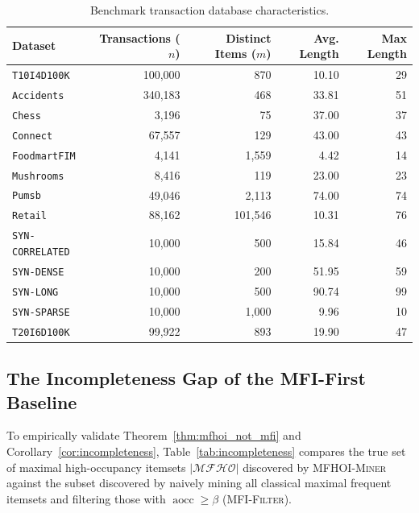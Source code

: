 \documentclass[runningheads,orivec]{llncs}
\newcommand{\aocc}{\operatorname{aocc}}
\newcommand{\MFHOI}{\ensuremath{\mathcal{MFHO}}}
\newcommand{\MFHOIMiner}{\textsc{MFHOI-Miner}}
\begin{document}
\begin{table}[htbp]
\centering
\caption{Benchmark transaction database characteristics.}
\label{tab:datasets}
\begin{tabular}{lrrrr}
\toprule
\textbf{Dataset} & \textbf{Transactions ($n$)} & \textbf{Distinct Items ($m$)} & \textbf{Avg. Length} & \textbf{Max Length} \\
\midrule
\texttt{T10I4D100K}    & 100,000 & 870     & 10.10 & 29 \\
\texttt{Accidents}     & 340,183 & 468     & 33.81 & 51 \\
\texttt{Chess}         & 3,196   & 75      & 37.00 & 37 \\
\texttt{Connect}       & 67,557  & 129     & 43.00 & 43 \\
\texttt{FoodmartFIM}   & 4,141   & 1,559   & 4.42  & 14 \\
\texttt{Mushrooms}     & 8,416   & 119     & 23.00 & 23 \\
\texttt{Pumsb}         & 49,046  & 2,113   & 74.00 & 74 \\
\texttt{Retail}        & 88,162  & 101,546 & 10.31 & 76 \\
\texttt{SYN-CORRELATED}& 10,000  & 500     & 15.84 & 46 \\
\texttt{SYN-DENSE}     & 10,000  & 200     & 51.95 & 59 \\
\texttt{SYN-LONG}      & 10,000  & 500     & 90.74 & 99 \\
\texttt{SYN-SPARSE}    & 10,000  & 1,000   & 9.96  & 10 \\
\texttt{T20I6D100K}    & 99,922  & 893     & 19.90 & 47 \\
\bottomrule
\end{tabular}
\end{table}

\subsection{The Incompleteness Gap of the MFI-First Baseline}

To empirically validate Theorem~\ref{thm:mfhoi_not_mfi} and Corollary~\ref{cor:incompleteness}, Table~\ref{tab:incompleteness} compares the true set of maximal high-occupancy itemsets $|\MFHOI|$ discovered by \MFHOIMiner{} against the subset discovered by naively mining all classical maximal frequent itemsets and filtering those with $\aocc \ge \beta$ (\textsc{MFI-Filter}).
\end{document}
